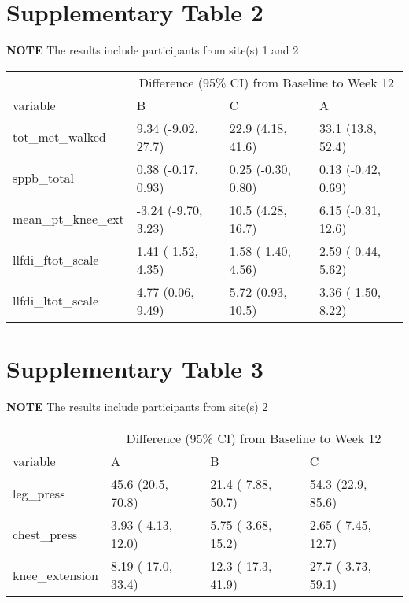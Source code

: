 \documentclass[]{article}
\begin{document}
\hypertarget{supplementary-table-2}{%
\section{Supplementary Table 2}\label{supplementary-table-2}}

\textbf{NOTE} The results include participants from site(s) 1 and 2

\begin{table}[H]
\centering
\begin{tabular}{l|l|l|l}
\hline
\multicolumn{1}{c|}{ } & \multicolumn{3}{c}{Difference (95\% CI) from Baseline to Week 12} \\
\cline{2-4}
variable & B & C & A\\
\hline
tot\_met\_walked & 9.34 (-9.02, 27.7) & 22.9 (4.18, 41.6) & 33.1 (13.8, 52.4)\\
\hline
sppb\_total & 0.38 (-0.17, 0.93) & 0.25 (-0.30, 0.80) & 0.13 (-0.42, 0.69)\\
\hline
mean\_pt\_knee\_ext & -3.24 (-9.70, 3.23) & 10.5 (4.28, 16.7) & 6.15 (-0.31, 12.6)\\
\hline
llfdi\_ftot\_scale & 1.41 (-1.52, 4.35) & 1.58 (-1.40, 4.56) & 2.59 (-0.44, 5.62)\\
\hline
llfdi\_ltot\_scale & 4.77 (0.06, 9.49) & 5.72 (0.93, 10.5) & 3.36 (-1.50, 8.22)\\
\hline
\end{tabular}
\end{table}

\hypertarget{supplementary-table-3}{%
\section{Supplementary Table 3}\label{supplementary-table-3}}

\textbf{NOTE} The results include participants from site(s) 2

\begin{table}[H]
\centering
\begin{tabular}{l|l|l|l}
\hline
\multicolumn{1}{c|}{ } & \multicolumn{3}{c}{Difference (95\% CI) from Baseline to Week 12} \\
\cline{2-4}
variable & A & B & C\\
\hline
leg\_press & 45.6 (20.5, 70.8) & 21.4 (-7.88, 50.7) & 54.3 (22.9, 85.6)\\
\hline
chest\_press & 3.93 (-4.13, 12.0) & 5.75 (-3.68, 15.2) & 2.65 (-7.45, 12.7)\\
\hline
knee\_extension & 8.19 (-17.0, 33.4) & 12.3 (-17.3, 41.9) & 27.7 (-3.73, 59.1)\\
\hline
\end{tabular}
\end{table}
\end{document}
